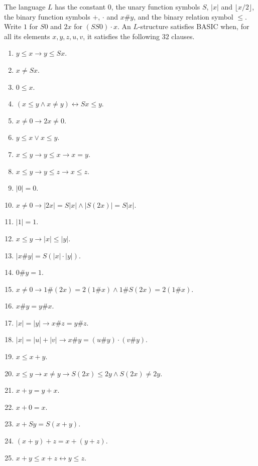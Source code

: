 \begin{definition}
  \label{def:arithmetic-basic}
  \leanok
  \own{}
  \infrastructure{}
  The language $L$ has the constant $0$, the unary function symbols $S$, $|x|$ and $\lfloor x/2
  \rfloor$, the binary function symbols $+$, $\cdot$ and $x \# y$, and the binary relation symbol
  $\le$. Write $1$ for $S0$ and $2x$ for $(SS0)\cdot x$. An $L$-structure satisfies BASIC when, for
  all its elements $x, y, z, u, v$, it satisfies the following $32$ clauses.
  \begin{enumerate}
    \item $y \le x \to y \le Sx$.
    \item $x \ne Sx$.
    \item $0 \le x$.
    \item $(x \le y \wedge x \ne y) \leftrightarrow Sx \le y$.
    \item $x \ne 0 \to 2x \ne 0$.
    \item $y \le x \vee x \le y$.
    \item $x \le y \to y \le x \to x = y$.
    \item $x \le y \to y \le z \to x \le z$.
    \item $|0| = 0$.
    \item $x \ne 0 \to |2x| = S|x| \wedge |S(2x)| = S|x|$.
    \item $|1| = 1$.
    \item $x \le y \to |x| \le |y|$.
    \item $|x \# y| = S(|x| \cdot |y|)$.
    \item $0 \# y = 1$.
    \item $x \ne 0 \to 1 \# (2x) = 2(1 \# x) \wedge 1 \# S(2x) = 2(1 \# x)$.
    \item $x \# y = y \# x$.
    \item $|x| = |y| \to x \# z = y \# z$.
    \item $|x| = |u| + |v| \to x \# y = (u \# y)\cdot(v \# y)$.
    \item $x \le x + y$.
    \item $x \le y \to x \ne y \to S(2x) \le 2y \wedge S(2x) \ne 2y$.
    \item $x + y = y + x$.
    \item $x + 0 = x$.
    \item $x + Sy = S(x + y)$.
    \item $(x + y) + z = x + (y + z)$.
    \item $x + y \le x + z \leftrightarrow y \le z$.

\end{enumerate}
\end{definition}
